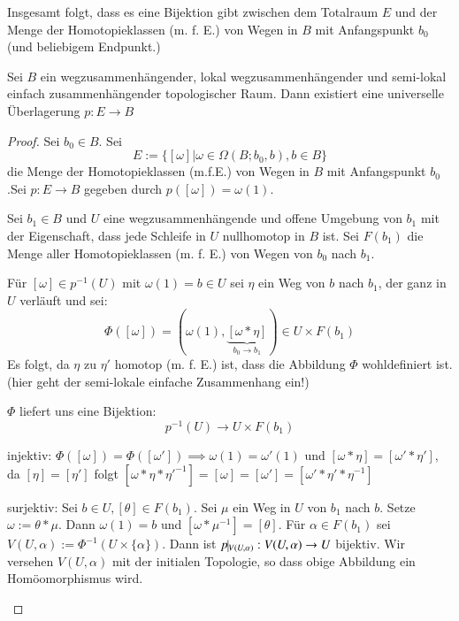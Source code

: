 \documentclass[a4paper,10pt]{scrartcl}
\begin{document}
Insgesamt folgt, dass es eine Bijektion gibt zwischen dem Totalraum $E$ und der Menge der Homotopieklassen (m. f. E.) von Wegen in $B$ mit Anfangspunkt $b_0$ (und beliebigem Endpunkt.)
\begin{st}
 Sei $B$ ein wegzusammenhängender, lokal wegzusammenhängender und semi-lokal einfach zusammenhängender topologischer Raum. Dann existiert eine universelle Überlagerung $p:E \to B$
\end{st}
\begin{proof}
 Sei $b_0\in B$. Sei 
\[
 E:=\{[\omega]|\omega\in \Omega(B;b_0, b), b\in B\} 
\]
die Menge der Homotopieklassen (m.f.E.) von Wegen in $B$ mit Anfangspunkt $b_0$.Sei $p:E\to B$ gegeben durch $p([\omega])=\omega(1)$.

Sei $b_1\in B$ und $U$ eine wegzusammenhängende und offene Umgebung von $b_1$ mit der Eigenschaft, dass jede Schleife in $U$ nullhomotop in $B$ ist. Sei $F(b_1)$ die Menge aller Homotopieklassen (m. f. E.) von Wegen von $b_0$ nach $b_1$.

\begin{figure}[H]
\centering
 \fixme[fig103]
\caption{}
\end{figure}
Für $[\omega]\in p^{-1}(U)$ mit $\omega(1)=b\in U$ sei $\eta$ ein Weg von $b$ nach $b_1$, der ganz in $U$ verläuft und sei:
\[
 \Phi([\omega])=(\omega(1), \underbrace{[\omega*\eta]}_{b_0 \rightarrow b_1})\in U \times F(b_1)
\]
Es folgt, da $\eta$ zu $\eta'$ homotop (m. f. E.) ist, dass die Abbildung $\Phi$ wohldefiniert ist. (hier geht der semi-lokale einfache Zusammenhang ein!)

$\Phi$ liefert uns eine Bijektion:
\[
 p^{-1}(U)\to U\times F(b_1)
\]
\begin{seg}{injektiv:}
 $\Phi([\omega])=\Phi([\omega'])\implies \omega(1)=\omega'(1)$ und $[\omega*\eta]=[\omega'*\eta']$, da $[\eta]=[\eta']$ folgt $[\omega*\eta*\eta'^{-1}]=[\omega]=[\omega']=[\omega'*\eta'*\eta^{-1}]$
\end{seg}
\begin{seg}{surjektiv:}
 Sei $b\in U, [\theta]\in F(b_1)$. Sei $\mu$ ein Weg in $U$ von $b_1$ nach $b$. Setze $\omega:=\theta*\mu$. Dann $\omega(1)=b$ und $[\omega*\mu^{-1}]=[\theta]$. Für $\alpha\in F(b_1)$ sei $V(U, \alpha):=\Phi^{-1}(U\times\{\alpha\})$. Dann ist $p\vline_{V(U, \alpha)}:V(U,\alpha)\to U$ bijektiv. Wir versehen $V(U,\alpha)$ mit der initialen Topologie, so dass obige Abbildung ein Homöomorphismus wird.
\end{seg}


\end{proof}
\end{document}
